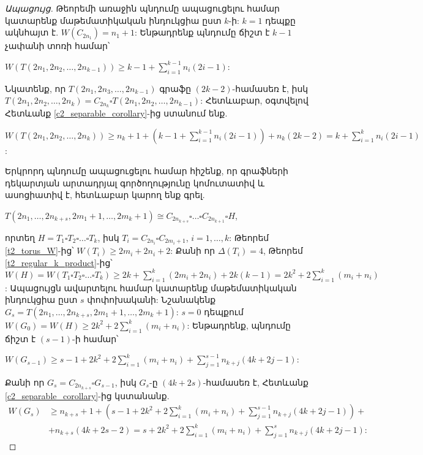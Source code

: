 \begin{proof}[Ապացույց]
Թեորեմի առաջին պնդումը ապացուցելու համար կատարենք մաթեմատիկական ինդուկցիա ըստ $k$-ի: $k=1$ դեպքը ակնհայտ է. $W(C_{2n_1})=n_1+1$: 
Ենթադրենք պնդումը ճիշտ է $k-1$ չափանի տոռի համար՝ 
\begin{center}
$W\left( T(2{n_1},2{n_2},\ldots,2{n_{k-1}}) \right) \ge k - 1 + \sum\limits_{i = 1}^{k-1} {{n_i}(2i - 1)}$:
\end{center}
Նկատենք, որ $T(2{n_1},2{n_3},\ldots,2{n_{k-1}})$ գրաֆը $(2k-2)$-համասեռ է, իսկ $T(2{n_1},2{n_2},\ldots,2{n_k}) = C_{2n_k} \square T(2{n_1},2{n_2},\ldots,2{n_{k-1}})$: Հետևաբար, օգտվելով Հետևանք \ref{c2_separable_corollary}-ից ստանում ենք.
\begin{center}
$W\left(T(2{n_1},2{n_2},\ldots,2{n_k})\right) \geq n_k+1 + (k-1 + \sum\limits_{i = 1}^{k-1} {{n_i}(2i - 1)}) + n_k(2k-2) = k + \sum\limits_{i = 1}^{k} {{n_i}(2i - 1)}$:
\end{center}
Երկրորդ պնդումը ապացուցելու համար հիշենք, որ գրաֆների դեկարտյան արտադրյալ գործողությունը կոմուտատիվ և ասոցիատիվ է, հետևաբար կարող ենք գրել.
\begin{center}
$T(2{n_1},\ldots,2{n_{k + s}},2{m_1} + 1,\ldots,2{m_k} + 1) \cong C_{2n_{k+s}} \square \ldots \square C_{2n_{k+1}} \square H$,
\end{center}
որտեղ $H=T_1 \square T_2 \square \ldots \square T_k$, իսկ $T_i = C_{2n_i} \square C_{2m_i+1}$, $i=1,\ldots,k$: Թեորեմ \ref{t2_torus_W}-ից՝ $W(T_i) \geq 2m_i + 2n_i + 2$: Քանի որ $\Delta(T_i) = 4$, Թեորեմ \ref{t2_regular_k_product}-ից՝\\
$W(H) = W\left( T_1 \square T_2 \square \ldots \square T_k \right) \geq 2k + \sum\limits_{i=1}^{k}{\left(2m_i+2n_i\right)} + 2k(k-1) = 2k^2 + 2\sum\limits_{i=1}^{k}{\left(m_i+n_i\right)}$: Ապացույցն ավարտելու համար կատարենք մաթեմատիկական ինդուկցիա ըստ $s$ փոփոխականի: Նշանակենք $G_s = T(2{n_1},\ldots,2{n_{k + s}},2{m_1} + 1,\ldots,2{m_k} + 1)$: 
$s=0$ դեպքում $W(G_0) = W(H) \geq 2k^2 + 2\sum\limits_{i=1}^{k}{\left(m_i+n_i\right)}$:
Ենթադրենք, պնդումը ճիշտ է $(s-1)$-ի համար՝
\begin{center}
$W(G_{s-1}) \geq s-1 + 2k^2 + 2\sum\limits_{i=1}^{k}{\left(m_i+n_i\right)} + \sum\limits_{j=1}^{s-1}{n_{k+j}(4k+2j-1)}$:
\end{center}
Քանի որ $G_s = C_{2n_{k+s}} \square G_{s-1}$, իսկ $G_s$-ը $(4k+2s)$-համասեռ է, Հետևանք \ref{c2_separable_corollary}-ից կստանանք.
\begin{align*}
W(G_s) &\geq n_{k+s} + 1 + \left(s-1 + 2k^2 + 2\sum\limits_{i=1}^{k}{\left(m_i+n_i\right)} + \sum\limits_{j=1}^{s-1}{n_{k+j}(4k+2j-1)}\right) +\\
& + n_{k+s}(4k+2s-2) = s + 2k^2 + 2\sum\limits_{i=1}^{k}{\left(m_i+n_i\right)} + \sum\limits_{j=1}^{s}{n_{k+j}(4k+2j-1)}:
\end{align*}
\end{proof}